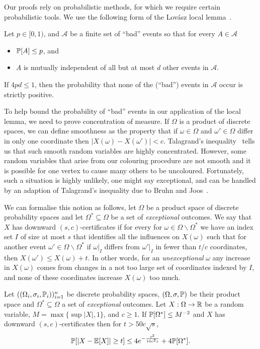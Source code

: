 Our proofs rely on probabilistic methods, for which we require certain probabilistic tools. We use the following form of the Lov\'asz local lemma~\cite{ErLo75}.

\begin{slll}
    Let $p\in[0,1)$, and $\mathcal{A}$ be a finite set of ``bad'' events so that for every $A\in\mathcal{A}$ 
    \begin{itemize}
    \item $\mathbb{P}[A]\leq p$, and 
    \item $A$ is mutually independent of all but at most $d$ other events in $\mathcal{A}$.
    \end{itemize}
    If $4pd\leq 1$, then the probability that none of the (``bad'') events in $\mathcal{A}$ occur is strictly positive. 
\end{slll}



To help bound the probability of ``bad'' events in our application of the local lemma, we need to prove concentration of measure.
If $\Omega$ is a product of discrete spaces, we can define smoothness as the property that if $\omega\in\Omega$ and $\omega'\in\Omega$ differ in only one coordinate then $|X(\omega)-X(\omega')|<c$. Talagrand's inequality~\cite{Tal95} tells us that such smooth random variables are highly concentrated. 
However, some random variables that arise from our colouring procedure are not smooth and it is possible for one vertex to cause many others to be uncoloured. Fortunately, such a situation is highly unlikely, one might say exceptional, and can be handled by an adaption of Talagrand's inequality due to Bruhn and Joos~\cite{BrJo18}.

We can formalise this notion as follows, let $\Omega$ be a product space of discrete probability spaces and let $\Omega^*\subseteq \Omega$ be a set of \emph{exceptional} outcomes. We say that $X$ has downward $(s,c)$-certificates if for every for  $\omega \in \Omega\backslash\Omega^*$ we have an index set $I$ of size at most $s$ that identifies all the influences on $X(\omega)$ such that for another event $\omega' \in \Omega\backslash\Omega^*$ if $\omega|_{I}$ differs from $\omega'|_{I}$ in fewer than ${t}/{c}$ coordinates, then $X(\omega')\leq X(\omega)+t$. 
In other words, for an \emph{unexceptional} $\omega$ any increase in $X(\omega)$ comes from changes in a not too large set of coordinates indexed by $I$, and none of these coordinates increase $X(\omega)$ too much. 
\begin{theorem}\label{thm:downward certs}
Let $((\Omega_i,\sigma_i,\mathbb{P}_i))_{i=1}^n$ be discrete probability spaces, $(\Omega,\sigma,\mathbb{P})$ be their product space and $\Omega^*\subseteq\Omega$ a set of \emph{exceptional} outcomes. Let $X:\Omega\to \mathbb{R}$ be a random variable, $M=\max\{\sup|X|,1\}$, and $c\geq 1$. If  $ \mathbb{P}[\Omega^*]\leq M^{-2}$ and $X$ has downward $(s,c)$-certificates then for $t>50c\sqrt{s}$,
\begin{equation}
    \mathbb{P}[|X-\mathbb{E}[X]|\geq t]\leq4e^{-\frac{t^2}{16c^2s}}+4\mathbb{P}[\Omega^*].
\end{equation}
\end{theorem}



